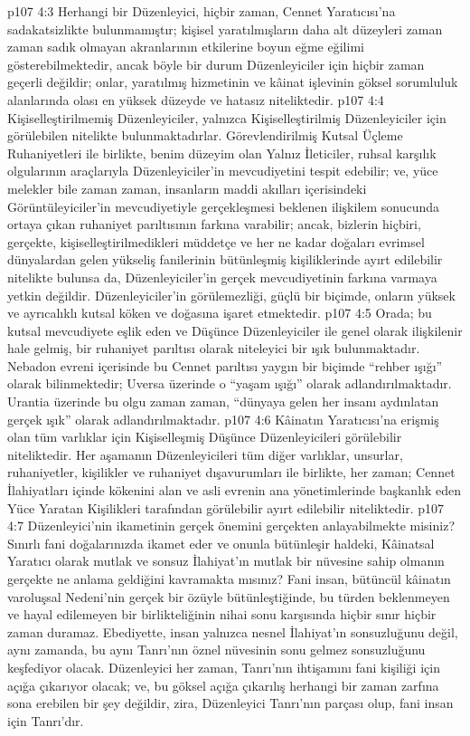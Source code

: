 \vs p107 4:3 Herhangi bir Düzenleyici, hiçbir zaman, Cennet Yaratıcısı’na sadakatsizlikte bulunmamıştır; kişisel yaratılmışların daha alt düzeyleri zaman zaman sadık olmayan akranlarının etkilerine boyun eğme eğilimi gösterebilmektedir, ancak böyle bir durum Düzenleyiciler için hiçbir zaman geçerli değildir; onlar, yaratılmış hizmetinin ve kâinat işlevinin göksel sorumluluk alanlarında olası en yüksek düzeyde ve hatasız niteliktedir.
\vs p107 4:4 Kişiselleştirilmemiş Düzenleyiciler, yalnızca Kişiselleştirilmiş Düzenleyiciler için görülebilen nitelikte bulunmaktadırlar. Görevlendirilmiş Kutsal Üçleme Ruhaniyetleri ile birlikte, benim düzeyim olan Yalnız İleticiler, ruhsal karşılık olgularının araçlarıyla Düzenleyiciler’in mevcudiyetini tespit edebilir; ve, yüce melekler bile zaman zaman, insanların maddi akılları içerisindeki Görüntüleyiciler’in mevcudiyetiyle gerçekleşmesi beklenen ilişkilem sonucunda ortaya çıkan ruhaniyet parıltısının farkına varabilir; ancak, bizlerin hiçbiri, gerçekte, kişiselleştirilmedikleri müddetçe ve her ne kadar doğaları evrimsel dünyalardan gelen yükseliş fanilerinin bütünleşmiş kişiliklerinde ayırt edilebilir nitelikte bulunsa da, Düzenleyiciler’in gerçek mevcudiyetinin farkına varmaya yetkin değildir. Düzenleyiciler’in görülemezliği, güçlü bir biçimde, onların yüksek ve ayrıcalıklı kutsal köken ve doğasına işaret etmektedir.
\vs p107 4:5 Orada; bu kutsal mevcudiyete eşlik eden ve Düşünce Düzenleyiciler ile genel olarak ilişkilenir hale gelmiş, bir ruhaniyet parıltısı olarak niteleyici bir ışık bulunmaktadır. Nebadon evreni içerisinde bu Cennet parıltısı yaygın bir biçimde “rehber ışığı” olarak bilinmektedir; Uversa üzerinde o “yaşam ışığı” olarak adlandırılmaktadır. Urantia üzerinde bu olgu zaman zaman, “dünyaya gelen her insanı aydınlatan gerçek ışık” olarak adlandırılmaktadır.
\vs p107 4:6 Kâinatın Yaratıcısı’na erişmiş olan tüm varlıklar için Kişiselleşmiş Düşünce Düzenleyicileri görülebilir niteliktedir. Her aşamanın Düzenleyicileri tüm diğer varlıklar, unsurlar, ruhaniyetler, kişilikler ve ruhaniyet dışavurumları ile birlikte, her zaman; Cennet İlahiyatları içinde kökenini alan ve asli evrenin ana yönetimlerinde başkanlık eden Yüce Yaratan Kişilikleri tarafından görülebilir ayırt edilebilir niteliktedir.
\vs p107 4:7 Düzenleyici’nin ikametinin gerçek önemini gerçekten anlayabilmekte misiniz? Sınırlı fani doğalarınızda ikamet eder ve onunla bütünleşir haldeki, Kâinatsal Yaratıcı olarak mutlak ve sonsuz İlahiyat’ın mutlak bir nüvesine sahip olmanın gerçekte ne anlama geldiğini kavramakta mısınız? Fani insan, bütüncül kâinatın varoluşsal Nedeni’nin gerçek bir özüyle bütünleştiğinde, bu türden beklenmeyen ve hayal edilemeyen bir birlikteliğinin nihai sonu karşısında hiçbir sınır hiçbir zaman duramaz. Ebediyette, insan yalnızca nesnel İlahiyat’ın sonsuzluğunu değil, aynı zamanda, bu aynı Tanrı’nın öznel nüvesinin sonu gelmez sonsuzluğunu keşfediyor olacak. Düzenleyici her zaman, Tanrı’nın ihtişamını fani kişiliği için açığa çıkarıyor olacak; ve, bu göksel açığa çıkarılış herhangi bir zaman zarfına sona erebilen bir şey değildir, zira, Düzenleyici Tanrı’nın parçası olup, fani insan için Tanrı’dır.
